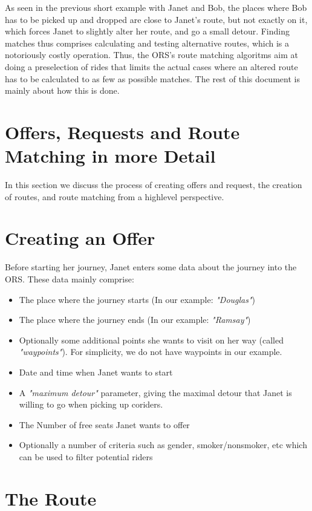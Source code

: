 As seen in the previous short example with Janet and Bob, the places where Bob has to be picked up and dropped are
close to Janet's route, but not exactly on it, which forces Janet to slightly alter her route, and go a small 
detour. Finding matches thus comprises calculating and testing alternative routes, which is a notoriously costly operation.
Thus, the ORS's route matching algoritms aim at doing a preselection of rides that limits the actual cases
where an altered route has to be calculated to as few as possible matches.
The rest of this document is mainly about how this is done.


\section{Offers, Requests and Route Matching in more Detail}

In this section we discuss the process of creating offers and request, the
creation of routes, and route matching from a highlevel perspective.

\section{Creating an Offer}
Before starting her journey, Janet enters some data about the journey into the ORS.
These data mainly comprise:

\begin{itemize}
\item{The place where the journey starts (In our example: \emph{"Douglas"})}
\item{The place where the journey ends (In our example: \emph{"Ramsay"})}
\item{Optionally some additional points she wants to visit on her way (called \emph{"waypoints"}).
      For simplicity, we do not have waypoints in our example.
      }
\item{Date and time when Janet wants to start}
\item{ A \emph{"maximum detour"} parameter, giving the maximal detour that Janet is willing
       to go when picking up coriders.	
      }
\item{The Number of free seats Janet wants to offer}
\item{Optionally a number of criteria such as gender, smoker/nonsmoker, etc 
      which can be used to filter potential riders
     }
\end{itemize}

\section{The Route}
\label{theRoute}

